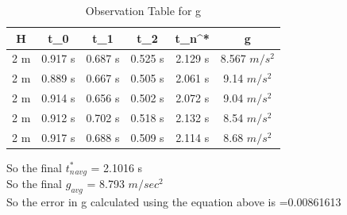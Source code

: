 \documentclass[11pt]{scrartcl} %
\begin{document}
\begin{table}[h]
\centering
\begin{tabular}{||c c c c c c||} 
\toprule
 \hline
 H & t_0 & t_1 & t_2 & t_n^* & g \\ [0.5ex] 
 \midrule
 \hline\hline
 2 m & 0.917 s & 0.687 s  & 0.525 s & 2.129 s & 8.567 $m/s^2$  \\ 
 \hline
 2 m & 0.889 s & 0.667 s & 0.505 s & 2.061 s & 9.14 $m/s^2$  \\
 \hline 
 2 m & 0.914 s & 0.656 s & 0.502 s & 2.072 s  & 9.04 $m/s^2$   \\
 \hline
 2 m & 0.912 s & 0.702 s & 0.518 s & 2.132 s  & 8.54 $m/s^2$   \\
 \hline
 2 m & 0.917 s & 0.688 s & 0.509 s & 2.114 s  & 8.68 $m/s^2$  \\ 
 [1ex]
 \bottomrule
 \hline
\end{tabular}
\caption{Observation Table for g}
\end{table}
So the final $t_n^*_{avg}$ = 2.1016 s\\
So the final $g_{avg}$ = 8.793 $m/sec^2$\\
So the error in g calculated using the equation above is =0.00861613
\end{document}
